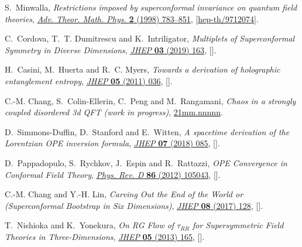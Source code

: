 \begin{thebibliography}{10}
S.~Minwalla, \emph{{Restrictions imposed by superconformal invariance on
  quantum field theories}},
  \href{http://dx.doi.org/10.4310/ATMP.1998.v2.n4.a4}{\emph{Adv. Theor. Math.
  Phys.} {\bfseries 2} (1998) 783--851},
  [\href{https://arxiv.org/abs/hep-th/9712074}{{\ttfamily hep-th/9712074}}].

C.~Cordova, T.~T. Dumitrescu and K.~Intriligator, \emph{{Multiplets of
  Superconformal Symmetry in Diverse Dimensions}},
  \href{http://dx.doi.org/10.1007/JHEP03(2019)163}{\emph{JHEP} {\bfseries 03}
  (2019) 163}, [\href{https://arxiv.org/abs/1612.00809}{{}}].

H.~Casini, M.~Huerta and R.~C. Myers, \emph{{Towards a derivation of
  holographic entanglement entropy}},
  \href{http://dx.doi.org/10.1007/JHEP05(2011)036}{\emph{JHEP} {\bfseries 05}
  (2011) 036}, [\href{https://arxiv.org/abs/1102.0440}{{}}].

C.-M. Chang, S.~Colin-Ellerin, C.~Peng and M.~Rangamani, \emph{{Chaos in a
  strongly coupled disordered 3d QFT (work in progress)}},
  \href{https://arxiv.org/abs/21mm.nnnnn}{{\ttfamily 21mm.nnnnn}}.

D.~Simmons-Duffin, D.~Stanford and E.~Witten, \emph{{A spacetime derivation of
  the Lorentzian OPE inversion formula}},
  \href{http://dx.doi.org/10.1007/JHEP07(2018)085}{\emph{JHEP} {\bfseries 07}
  (2018) 085}, [\href{https://arxiv.org/abs/1711.03816}{{}}].

D.~Pappadopulo, S.~Rychkov, J.~Espin and R.~Rattazzi, \emph{{OPE Convergence in
  Conformal Field Theory}},
  \href{http://dx.doi.org/10.1103/PhysRevD.86.105043}{\emph{Phys. Rev. D}
  {\bfseries 86} (2012) 105043},
  [\href{https://arxiv.org/abs/1208.6449}{{}}].

C.-M. Chang and Y.-H. Lin, \emph{{Carving Out the End of the World or
  (Superconformal Bootstrap in Six Dimensions)}},
  \href{http://dx.doi.org/10.1007/JHEP08(2017)128}{\emph{JHEP} {\bfseries 08}
  (2017) 128}, [\href{https://arxiv.org/abs/1705.05392}{{}}].

T.~Nishioka and K.~Yonekura, \emph{{On RG Flow of $\tau_{RR}$ for
  Supersymmetric Field Theories in Three-Dimensions}},
  \href{http://dx.doi.org/10.1007/JHEP05(2013)165}{\emph{JHEP} {\bfseries 05}
  (2013) 165}, [\href{https://arxiv.org/abs/1303.1522}{{}}].


\end{thebibliography}
